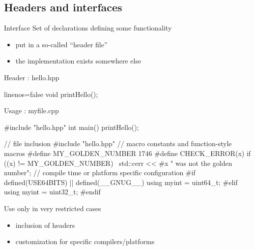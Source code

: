 \subsection[.h]{Headers and interfaces}

\begin{frame}[fragile]
  \begin{block}{Interface}
    Set of declarations defining some functionality
    \begin{itemize}
    \item put in a so-called ``header file''
    \item the implementation exists somewhere else
    \end{itemize}
  \end{block}
  \begin{block}{Header : hello.hpp}
    \begin{cppcode*}{linenos=false}
      void printHello();
    \end{cppcode*}
  \end{block}
  \begin{block}{Usage : myfile.cpp}
    \begin{cppcode*}{}
      #include "hello.hpp"
      int main() {
        printHello();
      }
    \end{cppcode*}
  \end{block}
\end{frame}

\begin{frame}[fragile]
  \begin{cppcode}
    // file inclusion
    #include "hello.hpp"
    // macro constants and function-style macros
    #define MY_GOLDEN_NUMBER 1746
    #define CHECK_ERROR(x) if ((x) != MY_GOLDEN_NUMBER) \
      std::cerr << #x " was not the golden number\n";
    // compile time or platform specific configuration
    #if defined(USE64BITS) || defined(__GNUG__)
      using myint = uint64_t;
    #elif
      using myint = uint32_t;
    #endif
  \end{cppcode}
  \pause
  \begin{block}{Use only in very restricted cases}
    \begin{itemize}
    \item inclusion of headers
    \item customization for specific compilers/platforms
    \end{itemize}
  \end{block}
\end{frame}

